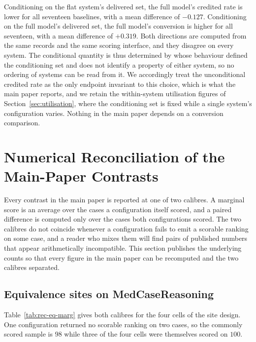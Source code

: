 \documentclass[letterpaper]{article}
\begin{document}
Conditioning on the flat system's delivered set, the full model's credited rate is lower for all seventeen baselines, with a mean difference of $-0.127$.
Conditioning on the full model's delivered set, the full model's conversion is higher for all seventeen, with a mean difference of $+0.319$.
Both directions are computed from the same records and the same scoring interface, and they disagree on every system.
The conditional quantity is thus determined by whose behaviour defined the conditioning set and does not identify a property of either system, so no ordering of systems can be read from it.
We accordingly treat the unconditional credited rate as the only endpoint invariant to this choice, which is what the main paper reports, and we retain the within-system utilisation figures of Section~\ref{sec:utilisation}, where the conditioning set is fixed while a single system's configuration varies.
Nothing in the main paper depends on a conversion comparison.

\section{Numerical Reconciliation of the Main-Paper Contrasts}
\label{sec:reconcile}

Every contrast in the main paper is reported at one of two calibres.
A marginal score is an average over the cases a configuration itself scored, and a paired difference is computed only over the cases both configurations scored.
The two calibres do not coincide whenever a configuration fails to emit a scorable ranking on some case, and a reader who mixes them will find pairs of published numbers that appear arithmetically incompatible.
This section publishes the underlying counts so that every figure in the main paper can be recomputed and the two calibres separated.

\subsection{Equivalence sites on MedCaseReasoning}

Table~\ref{tab:rec-eq-marg} gives both calibres for the four cells of the site design.
One configuration returned no scorable ranking on two cases, so the commonly scored sample is $98$ while three of the four cells were themselves scored on $100$.
\end{document}

